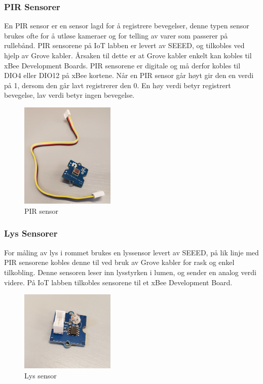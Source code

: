 \documentclass{article}
\begin{document}
\subsubsection{PIR Sensorer}
En PIR sensor er en sensor lagd for å registrere bevegelser, denne typen sensor brukes ofte for å utløse kameraer og for telling av varer som passerer på rullebånd. PIR sensorene på IoT labben er levert av SEEED, og tilkobles ved hjelp av Grove kabler. Årsaken til dette er at Grove kabler enkelt kan kobles til xBee Development Boards. PIR sensorene er digitale og må derfor kobles til DIO4 eller DIO12 på xBee kortene. Når en PIR sensor går høyt gir den en verdi på 1, dersom den går lavt registrerer den 0. En høy verdi betyr registrert bevegelse, lav verdi betyr ingen bevegelse.

\begin{figure}[!ht]
  \centering
      \includegraphics[width=0.4\textwidth]{pirsensor}
  \caption{PIR sensor}
\end{figure}

\subsubsection{Lys Sensorer}
For måling av lys i rommet brukes en lyssensor levert av SEEED, på lik linje med PIR sensorene kobles denne til ved bruk av Grove kabler for rask og enkel tilkobling. Denne sensoren leser inn lysstyrken i lumen, og sender en analog verdi videre. På IoT labben tilkobles sensorene til et xBee Development Board.

\begin{figure}[!ht]
  \centering
      \includegraphics[width=0.4\textwidth]{lyssensor}
  \caption{Lys sensor}
\end{figure}
\end{document}
